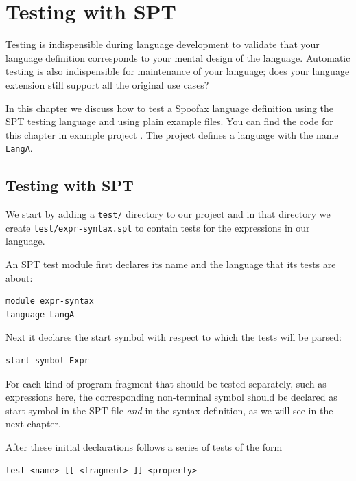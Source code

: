 \chapter{Testing with SPT}

Testing is indispensible during language development to validate that your
language definition corresponds to your mental design of the language. Automatic
testing is also indispensible for maintenance of your language; does your
language extension still support all the original use cases?

In this chapter we discuss how to test a Spoofax language definition using the
SPT testing language \cite{KatsVV11,KatsVV11a} and using plain example files.
You can find the code for this chapter in example project .
The project defines a language with the name \texttt{LangA}.

\section{Testing with SPT}

We start by adding a \texttt{test/} directory to our project and in that
directory we create \texttt{test/expr-syntax.spt} to contain tests for the
expressions in our language.

An SPT test module first declares its name and the language that its tests are
about:

\begin{lstlisting}[language=SPT]
module expr-syntax
language LangA
\end{lstlisting}

Next it declares the start symbol with respect to which the tests will be
parsed:

\begin{lstlisting}[language=SPT]
start symbol Expr
\end{lstlisting}

For each kind of program fragment that should be tested separately, such as
expressions here, the corresponding non-terminal symbol should be declared as
start symbol in the SPT file \emph{and} in the syntax definition, as we will see
in the next chapter.

After these initial declarations follows a series of tests of the form

\begin{lstlisting}[language=SPT]
test <name> [[ <fragment> ]] <property>
\end{lstlisting}

